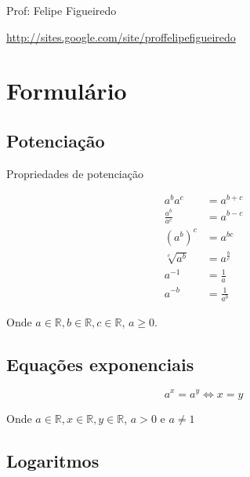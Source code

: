 \documentclass[a4paper]{article}
\begin{document}
\parbox[c]{.825\textwidth}{\raggedright%
{Prof: Felipe Figueiredo\par}
{\url{http://sites.google.com/site/proffelipefigueiredo}}

\vspace{1cm}
}


\section{Formulário}

\subsection{Potenciação}
Propriedades de potenciação

\begin{eqnarray*}
a^b a^c &= a^{b+c}\\
\frac{a^b}{a^c} &= a^{b-c}\\
(a^b)^c &= a^{bc}\\
\sqrt[c]{a^b} &= a^{\frac{b}{c}}\\
a^{-1} &= \frac{1}{a}\\
a^{-b} &= \frac{1}{a^b}
\end{eqnarray*}

Onde $a\in \mathbb{R}, b\in \mathbb{R}, c\in \mathbb{R}$, $a\ge0$.

\subsection{Equações exponenciais}

\begin{displaymath}
  a^x = a^y \Leftrightarrow x = y
\end{displaymath}

Onde $a\in \mathbb{R}, x\in \mathbb{R}, y\in \mathbb{R}$, $a>0$ e $a
\ne 1$

\subsection{Logaritmos}
\end{document}
